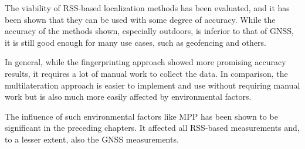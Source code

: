The viability of \ac{RSS}-based localization methods has been evaluated, and it has been shown that they can be used with some degree of accuracy.
While the accuracy of the methods shown, especially outdoors, is inferior to that of \ac{GNSS}, it is still good enough for many use cases, such as geofencing and others.

In general, while the fingerprinting approach showed more promising accuracy results, it requires a lot of manual work to collect the data.
In comparison, the multilateration approach is easier to implement and use without requiring manual work but is also much more easily affected by environmental factors.

The influence of such environmental factors like \ac{MPP} has been shown to be significant in the preceding chapters.
It affected all \ac{RSS}-based measurements and, to a lesser extent, also the \ac{GNSS} measurements.